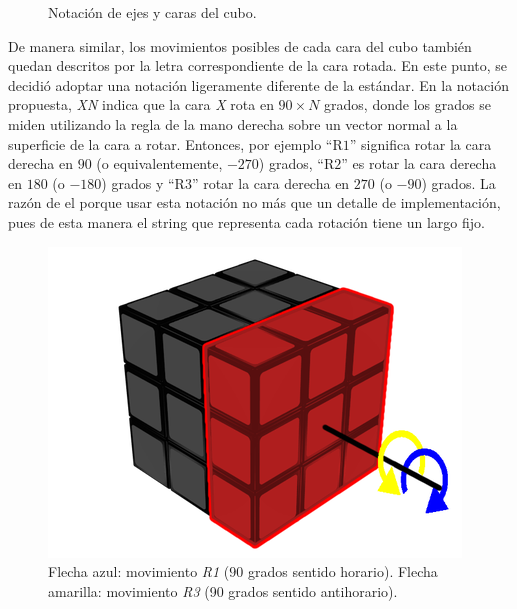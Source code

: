 \begin{figure}[h!]
	\centering
	\hfill
	\caption{Notación de ejes y caras del cubo.}
\end{figure}
De manera similar, los movimientos posibles de cada cara del cubo también quedan descritos por la letra correspondiente de la cara rotada.
En este punto, se decidió adoptar una notación ligeramente diferente de la estándar.
En la notación propuesta, \textit{XN} indica que la cara \textit{X} rota en $90 \times N$ grados, donde los grados se miden utilizando la regla de la mano derecha sobre un vector normal a la superficie de la cara a rotar.
Entonces, por ejemplo ``R$1$'' significa rotar la cara derecha en $90$ (o equivalentemente, $-270$) grados, ``R$2$'' es rotar la cara derecha en $180$ (o $-180$) grados y ``R$3$'' rotar la cara derecha en $270$ (o $-90$) grados.
La razón de el porque usar esta notación no más que un detalle de implementación, pues de esta manera el string que representa cada rotación tiene un largo fijo.

\begin{figure}[h!]
	\centering
	\includegraphics[scale=0.3]{figures/R1}
	\caption[Ejemplo de rotación.]{Flecha azul: movimiento \textit{R1} ($90$ grados sentido horario). Flecha amarilla: movimiento \textit{R3} (90 grados sentido antihorario).}
	\label{moveR}
\end{figure}

